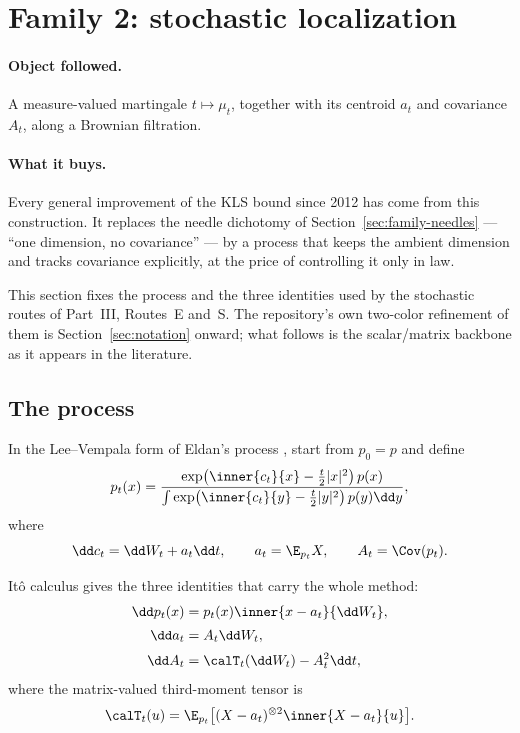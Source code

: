 \documentclass[../../main.tex]{subfiles}
\begin{document}
\section{Family 2: stochastic localization}
\label{sec:family-sl}

\paragraph{Object followed.}
A measure-valued martingale $t\mapsto\mu_t$, together with its centroid $a_t$ and covariance
$A_t$, along a Brownian filtration.

\paragraph{What it buys.}
Every general improvement of the KLS bound since 2012 has come from this construction. It replaces
the needle dichotomy of Section~\ref{sec:family-needles} --- ``one dimension, no covariance'' ---
by a process that keeps the ambient dimension and tracks covariance explicitly, at the price of
controlling it only in law.

This section fixes the process and the three identities used by the stochastic routes of Part~III,
Routes~E and~S. The
repository's own two-color refinement of them is Section~\ref{sec:notation} onward; what follows
is the scalar/matrix backbone as it appears in the literature.

\subsection{The process}
\label{subsec:sl-process}

In the Lee--Vempala form of Eldan's process \cite{LeeVempala2018,LeeVempala2024}, start from
$p_0=p$ and define
\begin{equation}
  p_t(x)=\frac{\exp\bigl(\inner{c_t}{x}-\frac t2|x|^2\bigr)\,p(x)}
              {\int\exp\bigl(\inner{c_t}{y}-\frac t2|y|^2\bigr)\,p(y)\dd y},
  \label{eq:sl-density}
\end{equation}
where
\[
  \dd c_t=\dd W_t+a_t\dd t,
  \qquad
  a_t=\E_{p_t}X,
  \qquad
  A_t=\Cov(p_t).
\]

It\^o calculus gives the three identities that carry the whole method:
\begin{align}
  \dd p_t(x)&=p_t(x)\inner{x-a_t}{\dd W_t},
  \label{eq:sl-density-sde}\\[2pt]
  \dd a_t&=A_t\dd W_t,
  \label{eq:sl-centroid-sde}\\[2pt]
  \dd A_t&=\calT_t(\dd W_t)-A_t^2\dd t,
  \label{eq:sl-covariance-sde}
\end{align}
where the matrix-valued third-moment tensor is
\begin{equation}
  \calT_t(u)=\E_{p_t}\bigl[(X-a_t)^{\otimes2}\inner{X-a_t}{u}\bigr].
  \label{eq:third-moment-tensor}
\end{equation}
\end{document}
